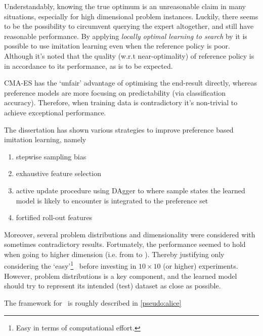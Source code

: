 Understandably, knowing the true optimum is an unreasonable claim in many 
situations, especially for high dimensional problem instances. 
Luckily, there seems to be the possibility to circumvent querying the expert 
altogether, and still have reasonable performance. 
By applying \emph{locally optimal learning to search} by \citet{ChangKADL15} it 
is possible to use imitation learning even when the reference policy is poor. 
Although it's noted that the quality (w.r.t near-optimality) of reference 
policy is in accordance to its performance, as is to be expected. 



CMA-ES has the `unfair' advantage of optimising the end-result directly, 
whereas preference models are more focusing on predictability (via 
classification accuracy). Therefore, when training data is contradictory it's 
non-trivial to achieve exceptional performance. 

The dissertation has shown various strategies to improve preference based 
imitation learning, namely
\begin{enumerate}
    \item stepwise sampling bias
    \item exhaustive feature selection
    \item active update procedure using DAgger to where sample states the 
    learned model is likely to encounter is integrated to the preference set
    \item fortified roll-out features
\end{enumerate}
Moreover, several problem distributions and dimensionality were considered with 
sometimes contradictory results. Fortunately, the performance seemed to hold 
when going to higher dimension (i.e. from \Problem[6\times5]{} to 
\Problem[10\times10]{}). Thereby justifying only considering the 
`easy'\footnote{Easy in terms of computational effort.} \JSP\ before investing 
in $10\times10$ (or higher) experiments. 
However, problem distributions is a key component, and the learned model should 
try to represent its intended (test) dataset as close as possible.



The framework for \Alice\ is roughly described in \cref{pseudo:alice}






